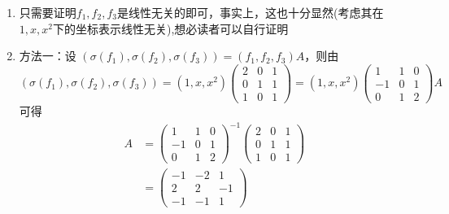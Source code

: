 \documentclass[UTF8,12pt,a4paper,fontset=fandol]{ctexart}
\begin{document}
\begin{solve}
\begin{enumerate}
                \item 只需要证明$f_1,f_2,f_3$是线性无关的即可，事实上，这也十分显然(考虑其在$1,x,x^2$下的坐标表示线性无关),想必读者可以自行证明

                \item 方法一：设 $ (\sigma(f_1), \sigma(f_2), \sigma(f_3)) = (f_1, f_2, f_3) A $，则由
                      \[ (\sigma(f_1), \sigma(f_2), \sigma(f_3)) = (1, x, x^2) \begin{pmatrix}
                              2 & 0 & 1 \\
                              0 & 1 & 1 \\
                              1 & 0 & 1
                          \end{pmatrix} = (1, x, x^2) \begin{pmatrix}
                              1  & 1 & 0 \\
                              -1 & 0 & 1 \\
                              0  & 1 & 2
                          \end{pmatrix} A \]
                      可得
                      \begin{align*}
                          A & = \begin{pmatrix}
                                    1  & 1 & 0 \\
                                    -1 & 0 & 1 \\
                                    0  & 1 & 2
                                \end{pmatrix}^{-1}
                          \begin{pmatrix}
                              2 & 0 & 1 \\
                              0 & 1 & 1 \\
                              1 & 0 & 1
                          \end{pmatrix}           \\
                            & = \begin{pmatrix}
                                    -1 & -2 & 1  \\
                                    2  & 2  & -1 \\
                                    -1 & -1 & 1
                                \end{pmatrix}

\end{align*}
\end{enumerate}
\end{solve}
\end{document}
